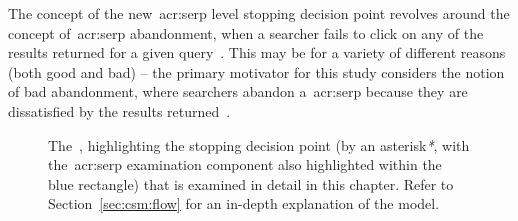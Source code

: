 The concept of the new~\gls{acr:serp} level stopping decision point revolves around the concept of~\gls{acr:serp} abandonment, when a searcher fails to click on any of the results returned for a given query~\citep{diriye2012abandonment, hassan2013serp_abandonment}. This may be for a variety of different reasons (both good and bad) -- the primary motivator for this study considers the notion of bad abandonment, where searchers abandon a~\gls{acr:serp} because they are dissatisfied by the results returned~\citep{hassan2013serp_abandonment}.

\begin{figure}[t!]
    \centering
    \caption[The~ and~\gls{acr:serp} stopping point]{The~, highlighting the stopping decision point (by an asterisk\emph{*}, with the~\gls{acr:serp} examination component also highlighted within the blue rectangle) that is examined in detail in this chapter. Refer to Section~\ref{sec:csm:flow} for an in-depth explanation of the model.}
    \label{fig:csm_ch9}
\end{figure}

